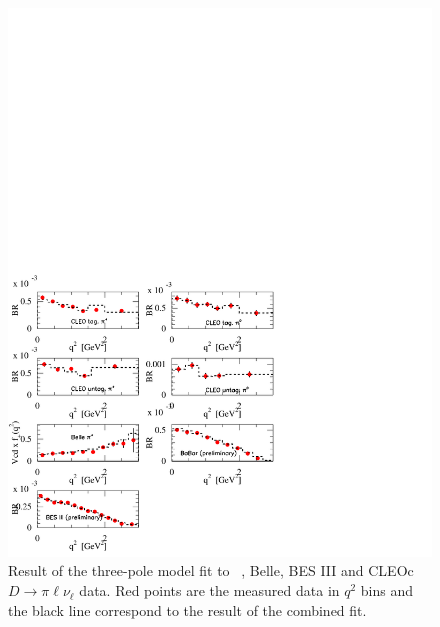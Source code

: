 \begin{figure}[p]
\begin{center}
\includegraphics[bb = 0 0 425 425, width=1\textwidth]{figures/charm/sl_plot3.pdf}
\caption{Result of the three-pole model fit \cite{Becirevic:2014kaa} to \babar~\cite{babar-new}, Belle\cite{Widhalm:2006wz}, 
BES III\cite{BESIII-new} and CLEOc~\cite{Besson:2009uv,Dobbs:2007aa} $D \to \pi \ell \nu_\ell $ data. Red points are the 
measured data in $q^2$ bins and the black line correspond to the result of the combined fit.
\label{plot3}
}
\end{center}
\end{figure}


